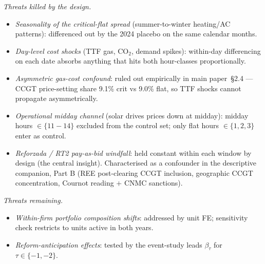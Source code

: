 \documentclass[11pt,a4paper]{article}
\begin{document}
\textit{Threats killed by the design.}
\begin{itemize}
   \item \emph{Seasonality of the critical-flat spread} (summer-to-winter heating/AC patterns): differenced out by the 2024 placebo on the same calendar months.
   \item \emph{Day-level cost shocks} (TTF gas, CO$_2$, demand spikes): within-day differencing on each date absorbs anything that hits both hour-classes proportionally.
   \item \emph{Asymmetric gas-cost confound}: ruled out empirically in main paper~\S2.4 --- CCGT price-setting share 9.1\% crit vs 9.0\% flat, so TTF shocks cannot propagate asymmetrically.
   \item \emph{Operational midday channel} (solar drives prices down at midday): midday hours $\in \{11\!-\!14\}$ excluded from the control set; only flat hours $\in \{1,2,3\}$ enter as control.
   \item \emph{Reforzada / RT2 pay-as-bid windfall}: held constant within each window by design (the central insight). Characterised as a confounder in the descriptive companion, Part B (REE post-clearing CCGT inclusion, geographic CCGT concentration, Cournot reading $+$ CNMC sanctions).
\end{itemize}

\textit{Threats remaining.}
\begin{itemize}
   \item \emph{Within-firm portfolio composition shifts}: addressed by unit FE; sensitivity check restricts to units active in both years.
   \item \emph{Reform-anticipation effects}: tested by the event-study leads $\beta_\tau$ for $\tau \in \{-1, -2\}$.
\end{itemize}
\end{document}
